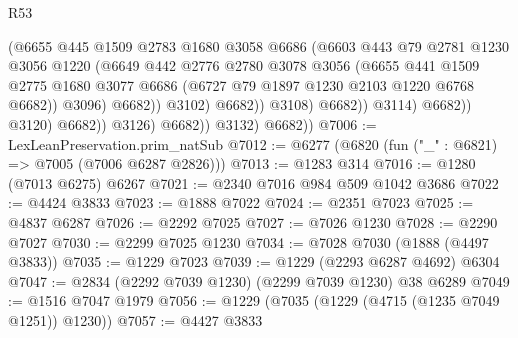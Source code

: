 \begin{lexlean}{R53}
\begin{coremodule}
                                        (@6655
                                          @445
                                          @1509
                                          @2783
                                          @1680
                                          @3058
                                          @6686
                                          (@6603
                                            @443
                                            @79
                                            @2781
                                            @1230
                                            @3056
                                            @1220
                                            (@6649
                                              @442
                                              @2776
                                              @2780
                                              @3078
                                              @3056
                                              (@6655
                                                @441
                                                @1509
                                                @2775
                                                @1680
                                                @3077
                                                @6686
                                                (@6727 @79 @1897 @1230 @2103 @1220 @6768 @6682))
                                              @3096)
                                            @6682))
                                        @3102)
                                      @6682))
                                  @3108)
                                @6682))
                            @3114)
                          @6682))
                      @3120)
                    @6682))
                @3126)
              @6682))
          @3132)
        @6682))
@7006 := LexLeanPreservation.prim_natSub
@7012 := @6277 (@6820 (fun ("_" : @6821) => @7005 (@7006 @6287 @2826)))
@7013 := @1283 @314
@7016 := @1280 (@7013 @6275) @6267
@7021 := @2340 @7016 @984 @509 @1042 @3686
@7022 := @4424 @3833
@7023 := @1888 @7022
@7024 := @2351 @7023
@7025 := @4837 @6287
@7026 := @2292 @7025
@7027 := @7026 @1230
@7028 := @2290 @7027
@7030 := @2299 @7025 @1230
@7034 := @7028 @7030 (@1888 (@4497 @3833))
@7035 := @1229 @7023
@7039 := @1229 (@2293 @6287 @4692) @6304
@7047 := @2834 (@2292 @7039 @1230) (@2299 @7039 @1230) @38 @6289
@7049 := @1516 @7047 @1979
@7056 := @1229 (@7035 (@1229 (@4715 (@1235 @7049 @1251)) @1230))
@7057 := @4427 @3833

\end{coremodule}
\end{lexlean}

